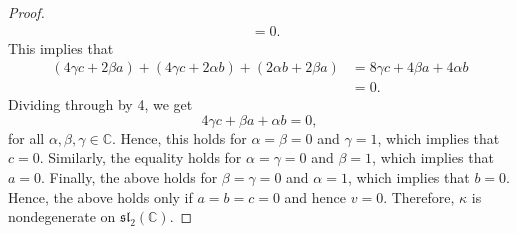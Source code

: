 \documentclass[12pt]{article}
\theoremstyle{definition}
\begin{document}
\begin{enumerate}
\begin{enumerate}[label=(\alph*)]
\begin{proof}
\begin{equation*}
\begin{split}
                                    &=0.
                                \end{split}
                            \end{equation*}
                        This implies that 
                            \begin{equation*}
                                \begin{split}
                                    (4\gamma c+2\beta a)+(4\gamma c+2\alpha b)+(2\alpha b+2\beta a) &=8\gamma c+4\beta a+4\alpha b \\
                                    &=0.
                                \end{split}
                            \end{equation*}
                        Dividing through by 4, we get 
                            \begin{equation*}
                                4\gamma c+\beta a+\alpha b=0,
                            \end{equation*}
                        for all $\alpha, \beta,\gamma\in\mathbb{C}$. Hence, this holds for $\alpha=\beta =0$ and $\gamma =1$, which implies that $c =0$. Similarly, the equality holds for $\alpha=\gamma = 0$ and $\beta = 1$, which implies that $a=0$. Finally, the above holds for $\beta=\gamma=0$ and $\alpha=1$, which implies that $b=0$. Hence, the above holds only if $a=b=c=0$ and hence $v=0$. Therefore, $\kappa$ is nondegenerate on $\mathfrak{sl}_2(\mathbb{C})$.
                    \end{proof}
            \end{enumerate}
    \end{enumerate}
\end{document}
